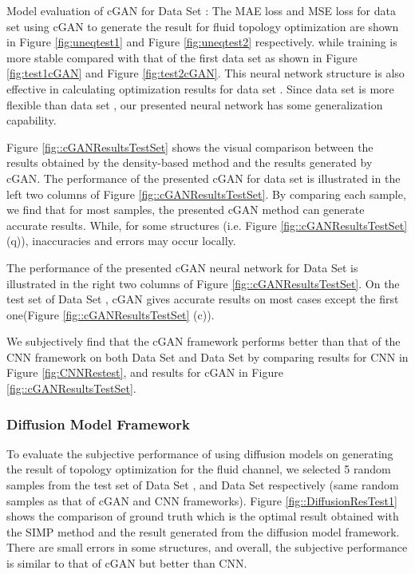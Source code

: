 \documentclass{article}
\begin{document}
Model evaluation of cGAN for Data Set \uppercase\expandafter{}:
The MAE loss and MSE loss for data set \uppercase\expandafter{} using cGAN to generate the result for fluid topology optimization are shown in Figure \ref{fig:uneqtest1} and Figure \ref{fig:uneqtest2} respectively. while training is more stable compared with that of the first data set as shown in Figure \ref{fig:test1cGAN} and Figure \ref{fig:test2cGAN}. This neural network structure is also effective in calculating optimization results for data set \uppercase\expandafter{}. Since
data set \uppercase\expandafter{} is more flexible than data set \uppercase\expandafter{}, our presented neural network has some generalization capability.

Figure \ref{fig::cGANResultsTestSet} shows the visual comparison between the results obtained by the density-based method and the results generated by cGAN. The performance of the presented cGAN for data set \uppercase\expandafter{}  is illustrated in the left two columns of Figure \ref{fig::cGANResultsTestSet}.  
 By comparing each sample, we find that for most samples, the presented cGAN method can generate accurate results. While, for some structures (i.e. Figure \ref{fig::cGANResultsTestSet} (q)), inaccuracies and errors may occur locally.

The performance of the presented cGAN neural network for Data Set \uppercase\expandafter{} is illustrated in the right two columns of Figure \ref{fig::cGANResultsTestSet}.  On the test set of Data Set \uppercase\expandafter{}, cGAN gives accurate results on most cases except the first one(Figure \ref{fig::cGANResultsTestSet} (c)).

We subjectively find that the cGAN framework performs better than that of the CNN framework on both Data Set \uppercase\expandafter{} and Data Set \uppercase\expandafter{} by comparing results for CNN in Figure \ref{fig:CNNRestest}, and results for cGAN in Figure \ref{fig::cGANResultsTestSet}.
\subsubsection{Diffusion Model Framework}
To evaluate the subjective performance of using diffusion models on generating the result of topology optimization for the fluid channel, we selected 5 random samples from the test set of Data Set \uppercase\expandafter{}, and Data Set \uppercase\expandafter{} respectively (same random samples as that of cGAN and CNN frameworks). Figure \ref{fig::DiffusionResTest1} shows the comparison of ground truth which is the optimal result obtained with the SIMP method and the result generated from the diffusion model framework. There are small errors in some structures, and overall, the subjective performance is similar to that of cGAN but better than CNN. 
\end{document}
